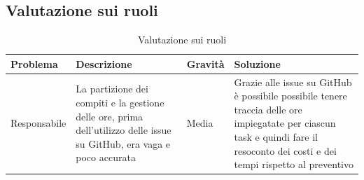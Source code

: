 \documentclass[a4paper,10pt]{article}
\begin{document}
\subsection{Valutazione sui ruoli}
\begin{table}[H]
\centering
\renewcommand{\arraystretch}{1.2}
\begin{tabular}{|p{3cm}|p{4cm}|p{2cm}|p{4cm}|}
\hline
\textbf{Problema} & \textbf{Descrizione} & \textbf{Gravità} & \textbf{Soluzione} \\
\hline
Responsabile &
La partizione dei compiti e la gestione delle ore, prima dell'utilizzo delle issue su GitHub, era vaga e poco accurata &
Media &
Grazie alle issue su GitHub è possibile possibile tenere traccia delle ore impiegatate per ciascun task e quindi fare il resoconto dei costi e dei tempi rispetto al preventivo \\
\hline
\end{tabular}
\caption{Valutazione sui ruoli}
\label{tab:valutazione-ruoli}
\end{table}
\end{document}
